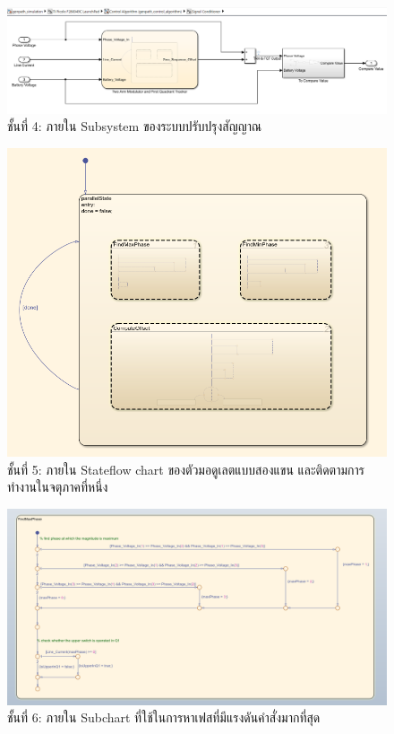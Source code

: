 \documentclass[11pt,a4paper]{article}
\begin{document}
\begin{figure}[H]
    \centering
    \includegraphics[width=\textwidth]{l4-sig-cond.png}
    \caption{ชั้นที่ 4: ภายใน Subsystem ของระบบปรับปรุงสัญญาณ}
\end{figure}

\begin{figure}[H]
    \centering
    \includegraphics[width=\textwidth]{tam-fqt-l1.png}
    \caption{ชั้นที่ 5: ภายใน Stateflow chart ของตัวมอดูเลตแบบสองแขน และติดตามการทำงานในจตุภาคที่หนึ่ง}
\end{figure}

\begin{figure}[H]
    \centering
    \includegraphics[width=\textwidth]{tam-fqt-l2-1.png}
    \caption{ชั้นที่ 6: ภายใน Subchart ที่ใช้ในการหาเฟสที่มีแรงดันคำสั่งมากที่สุด}
\end{figure}
\end{document}
